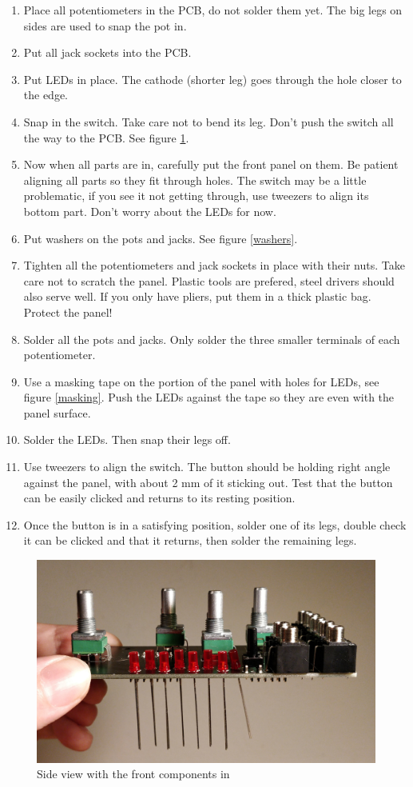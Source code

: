 \documentclass[10pt,a4paper,twocolumn]{article}
\begin{document}
\begin{enumerate}
  \item Place all potentiometers in the PCB, do not solder them yet. The big legs on sides are used to snap the pot in.
  \item Put all jack sockets into the PCB.
  \item Put LEDs in place. The cathode (shorter leg) goes through the hole closer to the edge.
  \item Snap in the switch. Take care not to bend its leg. Don't push the switch all the way to the PCB. See figure \ref{front components}.
  \item Now when all parts are in, carefully put the front panel on them. Be patient aligning all parts so they fit through holes. The switch may be a little problematic, if you see it not getting through, use tweezers to align its bottom part. Don't worry about the LEDs for now.
  \item Put washers on the pots and jacks. See figure \ref{washers}.
  \item Tighten all the potentiometers and jack sockets in place with their nuts. Take care not to scratch the panel. Plastic tools are prefered, steel drivers should also serve well. If you only have pliers, put them in a thick plastic bag. Protect the panel!
  \item Solder all the pots and jacks. Only solder the three smaller terminals of each potentiometer.
  \item Use a masking tape on the portion of the panel with holes for LEDs, see figure \ref{masking}. Push the LEDs against the tape so they are even with the panel surface.
  \item Solder the LEDs. Then snap their legs off.
  \item Use tweezers to align the switch. The button should be holding right angle against the panel, with about 2 mm of it sticking out. Test that the button can be easily clicked and returns to its resting position.
  \item Once the button is in a satisfying position, solder one of its legs, double check it can be clicked and that it returns, then solder the remaining legs.
\end{enumerate}

\begin{figure}[p]
  \centering
  \includegraphics[width=\linewidth]{p07.jpg}
  \caption{Side view with the front components in}
  \label{front components}
\end{figure}
\end{document}

